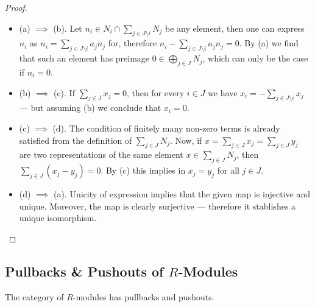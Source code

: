 \begin{proof}
\begin{itemize}\setlength\itemsep{0em}
\item (a) \(\implies\) (b). Let
  \(n_i \in N_i \cap \sum_{j \in J \setminus i} N_j\) be any element, then one
  can express \(n_i\) as \(n_i = \sum_{j \in J \setminus i} a_j  n_j\) for,
  therefore \(n_i - \sum_{j \in J \setminus i} a_j n_j = 0\). By (a) we find
  that such an element has preimage \(0 \in \bigoplus_{j \in J} N_j\), which can
  only be the case if \(n_i = 0\).

\item (b) \(\implies\) (c). If \(\sum_{j \in J} x_j = 0\), then for every \(i
  \in J\) we have \(x_i = - \sum_{j \in J \setminus i} x_j\) --- but assuming
  (b) we conclude that \(x_i = 0\).

\item (c) \(\implies\) (d). The condition of finitely many non-zero terms is
  already satisfied from the definition of \(\sum_{j \in J} N_j\). Now, if
  \(x = \sum_{j \in J} x_j = \sum_{j \in J} y_j\) are two representations of the
  same element \(x \in \sum_{j \in J} N_j\), then
  \(\sum_{j \in J}(x_j - y_j) = 0\). By (c) this implies in \(x_j = y_j\) for
  all \(j \in J\).

\item (d) \(\implies\) (a). Unicity of expression implies that the given map is
  injective and unique. Moreover, the map is clearly surjective --- therefore it
  stablishes a unique isomorphism.
\end{itemize}
\end{proof}

\subsection{Pullbacks \& Pushouts of \texorpdfstring{\(R\)}{R}-Modules}

\begin{theorem}
\label{thm:R-mod-pullback-pushouts}
The category of \(R\)-modules has pullbacks and pushouts.
\end{theorem}

